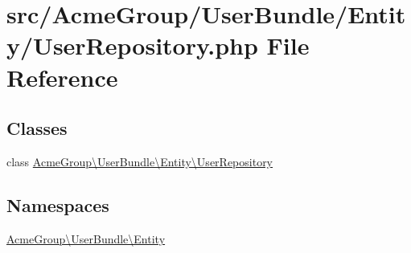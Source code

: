 \hypertarget{_user_repository_8php}{\section{src/\+Acme\+Group/\+User\+Bundle/\+Entity/\+User\+Repository.php File Reference}
\label{_user_repository_8php}
}
\subsection*{Classes}
\begin{DoxyCompactItemize}
\item 
class \hyperlink{class_acme_group_1_1_user_bundle_1_1_entity_1_1_user_repository}{Acme\+Group\textbackslash{}\+User\+Bundle\textbackslash{}\+Entity\textbackslash{}\+User\+Repository}
\end{DoxyCompactItemize}
\subsection*{Namespaces}
\begin{DoxyCompactItemize}
\item 
 \hyperlink{namespace_acme_group_1_1_user_bundle_1_1_entity}{Acme\+Group\textbackslash{}\+User\+Bundle\textbackslash{}\+Entity}
\end{DoxyCompactItemize}
